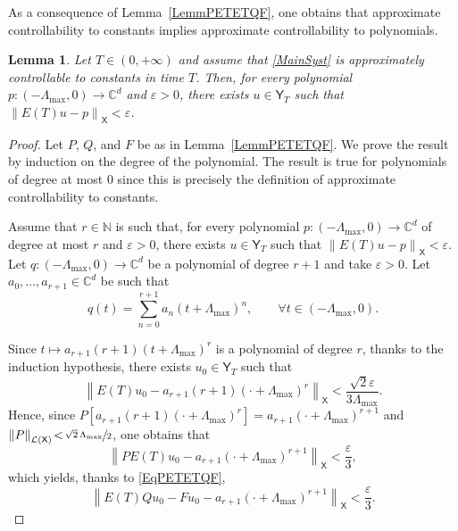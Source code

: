 \documentclass[10pt]{article}
\theoremstyle{plain}
\newtheorem{lemm}[theo]{Lemma}
\theoremstyle{definition}
\newcommand{\norm}[1]{\left\lVert #1\right\lVert}
\numberwithin{equation}{section}\numberwithin{figure}{section}\emergencystretch=3em
\begin{document}
As a consequence of Lemma~\ref{LemmPETETQF}, one obtains that approximate controllability to constants implies approximate controllability to polynomials.

\begin{lemm}
\label{LemmApproxToPoly}
Let $T \in (0, +\infty)$ and assume that \eqref{MainSyst} is approximately controllable to constants in time $T$. Then, for every polynomial $p: (-\Lambda_{\max}, 0) \to \mathbb C^d$ and $\varepsilon > 0$, there exists $u \in \mathsf Y_T$ such that $\norm{E(T) u - p}_{\mathsf X} < \varepsilon$.
\end{lemm}

\begin{proof}
Let $P$, $Q$, and $F$ be as in Lemma~\ref{LemmPETETQF}. We prove the result by induction on the degree of the polynomial. The result is true for polynomials of degree at most $0$ since this is precisely the definition of approximate controllability to constants.

Assume that $r \in \mathbb N$ is such that, for every polynomial $p: (-\Lambda_{\max}, 0) \to \mathbb C^d$ of degree at most $r$ and $\varepsilon > 0$, there exists $u \in \mathsf Y_T$ such that $\norm{E(T) u - p}_{\mathsf X} < \varepsilon$. Let $q: (-\Lambda_{\max}, 0) \to \mathbb C^d$ be a polynomial of degree $r + 1$ and take $\varepsilon > 0$. Let $a_0, \dots, a_{r+1} \in \mathbb C^d$ be such that
\[q(t) = \sum_{n=0}^{r + 1} a_n (t + \Lambda_{\max})^n, \qquad \forall t \in (-\Lambda_{\max}, 0).\]

Since $t \mapsto a_{r+1} (r+1) (t + \Lambda_{\max})^r$ is a polynomial of degree $r$, thanks to the induction hypothesis, there exists $u_0 \in \mathsf Y_T$ such that
\[
\norm{E(T) u_0 - a_{r+1} (r+1) (\cdot + \Lambda_{\max})^r}_{\mathsf X} < \frac{\sqrt{2}\varepsilon}{3 \Lambda_{\max}}.
\]
Hence, since $P \left[a_{r+1} (r+1) (\cdot + \Lambda_{\max})^r\right] \!=\!a_{r+1} (\cdot + \Lambda_{\max})^{r+1}$ and \hbox{$\norm{P}_{\mathcal L(\mathsf X)}\!<\!\sfrac{\sqrt{2}\, \Lambda_{\max}}{2}$}, one obtains that
\[
\norm{P E(T) u_0 - a_{r+1} (\cdot + \Lambda_{\max})^{r+1}}_{\mathsf X} < \frac{\varepsilon}{3},
\]
which yields, thanks to \eqref{EqPETETQF},
\begin{equation}
\label{EstimU0}
\norm{E(T) Q u_0 - F u_0 - a_{r+1} (\cdot + \Lambda_{\max})^{r+1}}_{\mathsf X} < \frac{\varepsilon}{3}.
\end{equation}


\end{proof}
\end{document}

